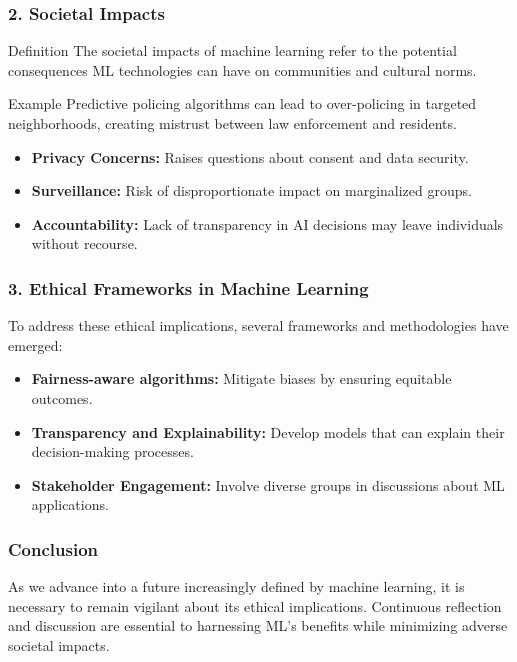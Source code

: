 \documentclass[aspectratio=169]{beamer}
\begin{document}
\begin{frame}[fragile]
    \frametitle{2. Societal Impacts}
    \begin{block}{Definition}
        The societal impacts of machine learning refer to the potential consequences ML technologies can have on communities and cultural norms.
    \end{block}
    
    \begin{block}{Example}
        Predictive policing algorithms can lead to over-policing in targeted neighborhoods, creating mistrust between law enforcement and residents.
    \end{block}
    
    \begin{itemize}
        \item \textbf{Privacy Concerns:} Raises questions about consent and data security.
        \item \textbf{Surveillance:} Risk of disproportionate impact on marginalized groups.
        \item \textbf{Accountability:} Lack of transparency in AI decisions may leave individuals without recourse.
    \end{itemize}
\end{frame}

\begin{frame}[fragile]
    \frametitle{3. Ethical Frameworks in Machine Learning}
    To address these ethical implications, several frameworks and methodologies have emerged:
    \begin{itemize}
        \item \textbf{Fairness-aware algorithms:} Mitigate biases by ensuring equitable outcomes.
        \item \textbf{Transparency and Explainability:} Develop models that can explain their decision-making processes.
        \item \textbf{Stakeholder Engagement:} Involve diverse groups in discussions about ML applications.
    \end{itemize}
\end{frame}

\begin{frame}[fragile]
    \frametitle{Conclusion}
    As we advance into a future increasingly defined by machine learning, it is necessary to remain vigilant about its ethical implications. Continuous reflection and discussion are essential to harnessing ML's benefits while minimizing adverse societal impacts.
\end{frame}
\end{document}
